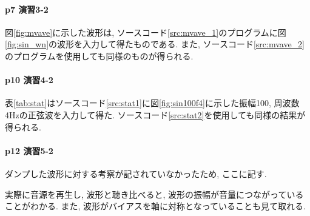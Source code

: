 \documentclass[titlepage]{jsarticle}
\begin{document}
\paragraph{p7 演習3-2} 図\ref{fig:mvave}に示した波形は,
    ソースコード\ref{src:mvave_1}のプログラムに図\ref{fig:sin_wn}の波形を入力して得たものである.
    また, ソースコード\ref{src:mvave_2}のプログラムを使用しても同様のものが得られる.

\paragraph{p10 演習4-2} 表\ref{tab:stat}はソースコード\ref{src:stat1}に図\ref{fig:sin100f4}に示した振幅100, 周波数4Hzの正弦波を入力して得た.
    ソースコード\ref{src:stat2}を使用しても同様の結果が得られる.

\paragraph{p12 演習5-2} ダンプした波形に対する考察が記されていなかったため, ここに記す.

    実際に音源を再生し, 波形と聴き比べると, 波形の振幅が音量につながっていることがわかる.
    また, 波形がバイアスを軸に対称となっていることも見て取れる.
\end{document}
